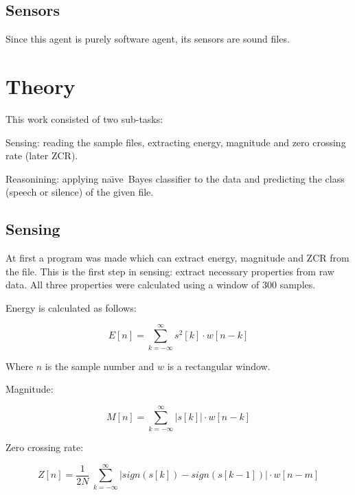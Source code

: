 \documentclass[english,11pt]{article}
\newcommand{\naive}{na\"{\i}ve\ }
\begin{document}
\subsection{Sensors}
Since this agent is purely software agent, its sensors are sound files.


\section{Theory}

This work consisted of two sub-tasks:
\begin{description}
    \item{Sensing:} reading the sample files, extracting energy, magnitude and
        zero crossing rate (later ZCR).

    \item{Reasonining:} applying \naive Bayes classifier to the data and
        predicting the class (speech or silence) of the given file.
\end{description}

\subsection{Sensing}

At first a program was made which can extract energy, magnitude and ZCR from
the file. This is the first step in sensing: extract necessary properties from
raw data. All three properties were calculated using a window of 300 samples.

Energy is calculated as follows:

$$ E[n] = \sum_{k=-\infty}^{\infty} s^2[k] \cdot w[n-k] $$

Where $n$ is the sample number and $w$ is a rectangular window.


Magnitude:

$$ M[n] = \sum_{k=-\infty}^{\infty} |s[k]| \cdot w[n-k] $$

Zero crossing rate:

$$ Z[n] = \frac{1}{2N} \
    \sum_{k=-\infty}^{\infty}
    |sign(s[k]) - sign(s[k-1])| \cdot w[n-m]
$$
\end{document}
